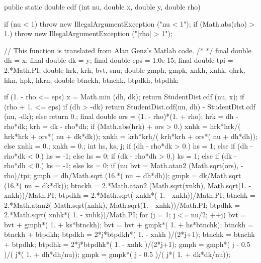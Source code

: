 \begin{code}

   public static double cdf (int nu, double x, double y, double rho) \begin{hide} {
      if (nu < 1)
         throw new IllegalArgumentException ("nu < 1");
      if (Math.abs(rho) > 1.)
         throw new IllegalArgumentException ("|rho| > 1");

// This function is translated from Alan Genz's Matlab code.
/*
%
%
%
%
*/
      final double dh = x;
      final double dk = y;
      final double eps = 1.0e-15;
      final double tpi = 2.*Math.PI;
      double hrk, krh, bvt, snu;
      double gmph, gmpk, xnkh, xnhk, qhrk, hkn, hpk, hkrn;
      double btnckh, btnchk, btpdkh, btpdhk;
       
      if (1. - rho <= eps) {
         x = Math.min (dh, dk);
         return StudentDist.cdf (nu, x);
      }
      if (rho + 1. <= eps) {
         if (dh > -dk)  
            return StudentDist.cdf(nu, dh) - StudentDist.cdf (nu, -dk);
         else
            return 0.;
      }
      final double ors = (1. - rho)*(1. + rho);
      hrk = dh - rho*dk; krh = dk - rho*dh; 
      if (Math.abs(hrk) + ors > 0.) {
        xnhk = hrk*hrk/( hrk*hrk + ors*( nu + dk*dk));
        xnkh = krh*krh/( krh*krh + ors*( nu + dh*dh));
      } else {
        xnhk = 0.;
        xnkh = 0.; 
      }
      int hs, ks, j;
      if (dh - rho*dk > 0.)
         hs = 1;
      else if (dh - rho*dk < 0.)
         hs = -1;
      else
         hs = 0;
      if (dk - rho*dh > 0.)
         ks = 1;
      else if (dk - rho*dh < 0.)
         ks = -1;
      else
         ks = 0;
      if (nu %
         bvt = Math.atan2 (Math.sqrt(ors), -rho)/tpi;
         gmph = dh/Math.sqrt (16.*( nu + dh*dh));
         gmpk = dk/Math.sqrt (16.*( nu + dk*dk)); 
         btnckh = 2.*Math.atan2 (Math.sqrt(xnkh), Math.sqrt(1. - xnkh))/Math.PI;
         btpdkh = 2.*Math.sqrt( xnkh*( 1. - xnkh))/Math.PI;
         btnchk = 2.*Math.atan2( Math.sqrt(xnhk), Math.sqrt(1. - xnhk))/Math.PI;
         btpdhk = 2.*Math.sqrt( xnhk*( 1. - xnhk))/Math.PI;
         for (j = 1; j <= nu/2; ++j) {
            bvt = bvt + gmph*( 1. + ks*btnckh); 
            bvt = bvt + gmpk*( 1. + hs*btnchk);
            btnckh = btnckh + btpdkh;
            btpdkh = 2*j*btpdkh*( 1. - xnkh )/(2*j+1); 
            btnchk = btnchk + btpdhk;
            btpdhk = 2*j*btpdhk*( 1. - xnhk )/(2*j+1); 
            gmph = gmph*( j - 0.5 )/( j*( 1. + dh*dh/nu));
            gmpk = gmpk*( j - 0.5 )/( j*( 1. + dk*dk/nu));
         }

}
\end{hide}
\end{code}
